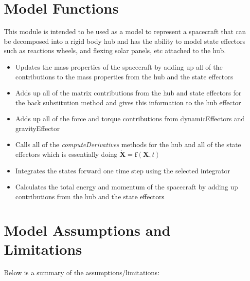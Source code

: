 \section{Model Functions}

This module is intended to be used as a model to represent a spacecraft that can be decomposed into a rigid body hub and has the ability to model state effectors such as reactions wheels, and flexing solar panels, etc attached to the hub.  

\begin{itemize}
	\item Updates the mass properties of the spacecraft by adding up all of the contributions to the mass properties from the hub and the state effectors
	\item Adds up all of the matrix contributions from the hub and state effectors for the back substitution method and gives this information to the hub effector
	\item Adds up all of the force and torque contributions from dynamicEffectors and gravityEffector
	\item Calls all of the \textit{computeDerivatives} methods for the hub and all of the state effectors which is essentially doing $\dot{\bm X} = \bm f(\bm X, t)$
	\item Integrates the states forward one time step using the selected integrator
	\item Calculates the total energy and momentum of the spacecraft by adding up contributions from the hub and the state effectors
\end{itemize}

\section{Model Assumptions and Limitations}
Below is a summary of the assumptions/limitations:

